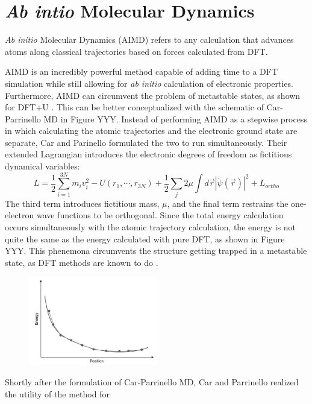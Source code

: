 \documentclass[3p,review,12pt]{elsarticle}
\begin{document}
\section{\emph{Ab intio} Molecular Dynamics}
\emph{Ab initio} Molecular Dynamics (AIMD) refers to any calculation that advances atoms along classical trajectories based on forces calculated from DFT\cite{Sholl2009}.
\par 
AIMD is an incredibly powerful method capable of adding time to a DFT simulation while still allowing for \emph{ab initio} calculation of electronic properties. Furthermore, AIMD can circumvent the problem of metastable states, as shown for DFT+U \cite{Zhang2015}. This can be better conceptualized with the schematic of Car-Parrinello MD in Figure YYY. Instead of performing AIMD as a stepwise process in which calculating the atomic trajectories and the electronic ground state are separate, Car and Parinello formulated the two to run simultaneously. Their extended Lagrangian introduces the electronic degrees of freedom as fictitious dynamical variables:
\begin{equation}
L =\frac{1}{2}\sum_{i=1}^{3N}m_{i}v^{2}_{i}-U(r_{1}, \cdots, r_{3N})+\frac{1}{2}\sum_{j}2\mu \int d\vec{r}|\dot{\psi}(\vec{r})|^{2}+L_{ortho}
\end{equation}
The third term introduces fictitious mass, $\mu$, and the final term restrains the one-electron wave functions to be orthogonal. Since the total energy calculation occurs simultaneously with the atomic trajectory calculation, the energy is not quite the same as the energy calculated with pure DFT, as shown in Figure YYY. This phenemona circumvents the structure getting trapped in a metastable state, as DFT methods are known to do \cite{Dorado2013}.
\begin{figure}[h]
	\includegraphics[width=0.5\textwidth]{practical1}
	\centering
	\caption{} 
\end{figure}

\par
Shortly after the formulation of Car-Parrinello MD, Car and Parrinello realized the utility of the method for 
\end{document}
